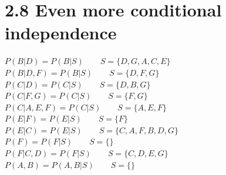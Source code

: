 \documentclass [11pt, a4paper, oneside] {article}
\begin{document}
\section *{2.8 Even more conditional independence}
$P(B|D) = P(B|S) \qquad S = \{D, G, A, C, E\}$\\
$P(B|D, F) = P(B|S) \qquad S = \{D, F, G\}$\\
$P(C|D) = P(C|S) \qquad S = \{D, B, G\}$\\
$P(C|F, G) = P(C|S) \qquad S = \{F, G\}$\\
$P(C|A, E, F) = P(C|S) \qquad S = \{A, E, F\}$\\
$P(E|F) = P(E|S) \qquad S = \{F\}$\\
$P(E|C) = P(E|S) \qquad S = \{C, A, F, B, D, G\}$\\
$P(F) = P(F|S) \qquad S = \{\}$\\
$P(F|C, D) = P(F|S) \qquad S = \{C, D, E, G\}$\\
$P(A, B) = P(A, B|S) \qquad S = \{\}$\\
\end{document}
